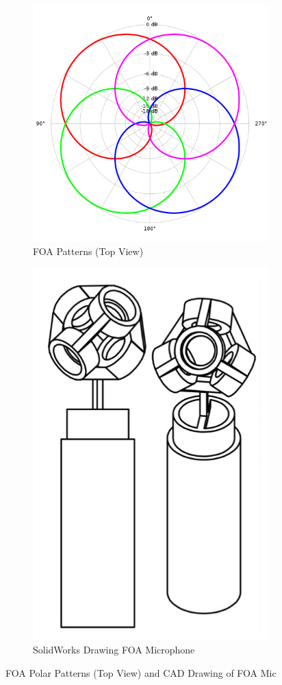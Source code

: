 \begin{figure}
\centering
\begin{subfigure}{.5\textwidth}
  \centering
  \includegraphics[width=.6\linewidth]{img/foa-pattern.png}
  \caption{FOA Patterns (Top View) \cite{FileNaiv77online}}
  \label{fig:foa-patt}
\end{subfigure}
\begin{subfigure}{.5\textwidth}
  \centering
  \includegraphics[width=.6\linewidth]{img/yigal-kamel.JPG}
  \caption{SolidWorks Drawing FOA Microphone}
  \label{fig:yigal-kamel}
\end{subfigure}
\caption{FOA Polar Patterns (Top View) and CAD Drawing of FOA Mic}
\label{fig:foa-patt-n-mic}
\end{figure}

